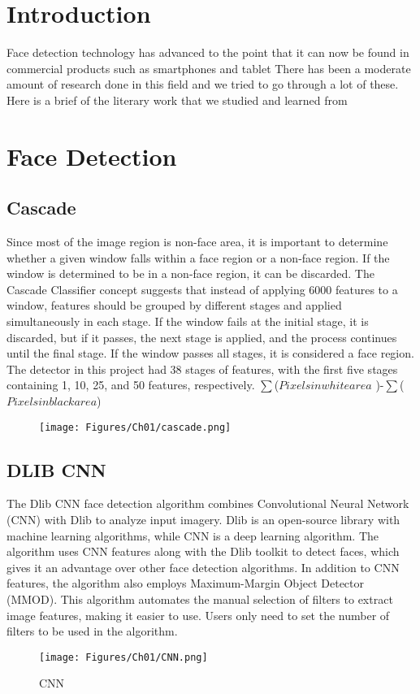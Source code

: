 \section{Introduction}
Face detection technology has advanced to the point that it can now be found in commercial products such as smartphones and tablet
There has been a moderate amount of research done in this field and we tried to go
through a lot of these. Here is a brief of the literary work that we studied and learned from

\section{Face Detection}
\subsection{Cascade}
Since most of the image region is non-face area, it is important to determine whether a given window falls within a face region or a non-face region. If the window is determined to be in a non-face region, it can be discarded. The Cascade Classifier concept suggests that instead of applying 6000 features to a window, features should be grouped by different stages and applied simultaneously in each stage. If the window fails at the initial stage, it is discarded, but if it passes, the next stage is applied, and the process continues until the final stage. If the window passes all stages, it is considered a face region. The detector in this project had 38 stages of features, with the first five stages containing 1, 10, 25, and 50 features, respectively.
\newline  
$  \sum $($Pixels in white area$ )-$\sum$($Pixels in black area$)
\begin{figure}[!htb]
    \centering
    \texttt{[image: Figures/Ch01/cascade.png]}
    \label{figure:cascade}
    \end{figure}
\clearpage

\subsection{DLIB CNN}
The Dlib CNN face detection algorithm combines Convolutional Neural Network (CNN) with Dlib to analyze input imagery. Dlib is an open-source library with machine learning algorithms, while CNN is a deep learning algorithm. The algorithm uses CNN features along with the Dlib toolkit to detect faces, which gives it an advantage over other face detection algorithms. In addition to CNN features, the algorithm also employs Maximum-Margin Object Detector (MMOD). This algorithm automates the manual selection of filters to extract image features, making it easier to use. Users only need to set the number of filters to be used in the algorithm.
\begin{figure}[!htb]
    \centering
    \texttt{[image: Figures/Ch01/CNN.png]}
    \caption{CNN}
    \label{figure:CNN}
    \end{figure}

